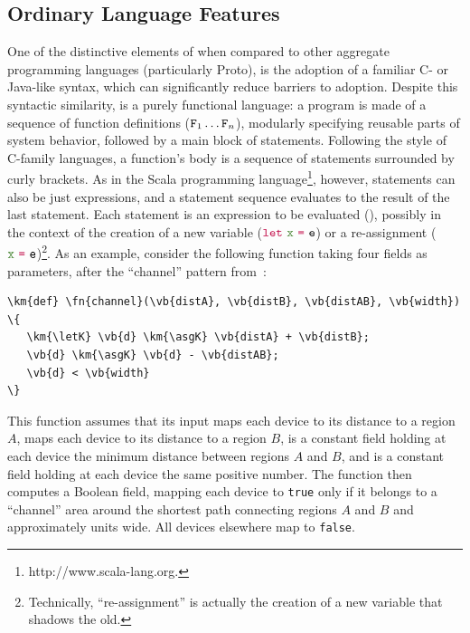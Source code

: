 \documentclass[12pt,a4paper,twoside,openright]{book}
\begin{document}
\subsection{Ordinary Language Features}

One of the distinctive elements of \protelis{} when compared to other aggregate programming languages (particularly Proto), is the adoption of a familiar C- or Java-like syntax, which can significantly reduce barriers to adoption.
%
Despite this syntactic similarity, \protelis{} is a purely functional language: a program is made of a sequence of function definitions ($\texttt{F}_1\ldots\texttt{F}_n$), modularly specifying reusable parts of system behavior, followed by a main block of statements.
%
Following the style of C-family languages, a function's body is a sequence of statements surrounded by curly brackets.  As in the Scala programming language\footnote{http://www.scala-lang.org.}, however, statements can also be just expressions, and a statement sequence evaluates to the result of the last statement.
%
Each statement is an expression to be evaluated (\e), possibly in the context of the creation of a new variable ($\km{\letK} \vb{\var} \km{\asgK} \e$) or a re-assignment ($\vb{\var} \km{\asgK} \e$)\footnote{Technically, ``re-assignment'' is actually the creation of a new variable that shadows the old.}.
%
As an example, consider the following function taking four fields as parameters, after the ``channel'' pattern from~\cite{butera}:
\begin{center}
\begin{Verbatim}[samepage=true, frame=single, commandchars=\\\{\}]
\km{def} \fn{channel}(\vb{distA}, \vb{distB}, \vb{distAB}, \vb{width}) \{
   \km{\letK} \vb{d} \km{\asgK} \vb{distA} + \vb{distB};
   \vb{d} \km{\asgK} \vb{d} - \vb{distAB};
   \vb{d} < \vb{width}
\}
\end{Verbatim}
\end{center}
This function assumes that its input \texttt{} maps each device to its distance to a region $A$, \texttt{} maps each device to its distance to a region $B$, \texttt{} is a constant field holding at each device the minimum distance between regions $A$ and $B$, and \texttt{} is a constant field holding at each device the same positive number.
%
The function then computes a Boolean field, mapping each device to \texttt{true} only if it belongs to a ``channel'' area around the shortest path connecting regions $A$ and $B$ and approximately \texttt{} units wide.
%
All devices elsewhere map to \texttt{false}.
\end{document}
